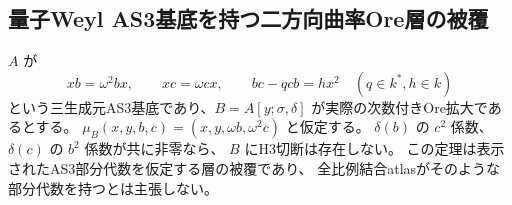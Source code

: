 \subsection{量子Weyl AS3基底を持つ二方向曲率Ore層の被覆}
\label{subsec:cubic-third-root-unit-normalx-Ore-cover}
\begin{theorem}[指定量子Weyl基底Ore層の全排除]
\label{thm:cubic-third-root-unit-normalx-Ore-cover-empty}
$A$ が
\[
 xb=\omega^2bx,\qquad xc=\omega cx,\qquad bc-qcb=h x^2
 \quad(q\in k^*,h\in k)
\]
という三生成元AS3基底であり、$B=A[y;\sigma,\delta]$ が実際の次数付きOre拡大であるとする。
$\mu_B(x,y,b,c)=(x,y,\omega b,\omega^2c)$ と仮定する。
$\delta(b)$ の $c^2$ 係数、$\delta(c)$ の $b^2$ 係数が共に非零なら、
$B$ にH3切断は存在しない。
この定理は表示されたAS3部分代数を仮定する層の被覆であり、
全比例結合atlasがそのような部分代数を持つとは主張しない。
\end{theorem}
